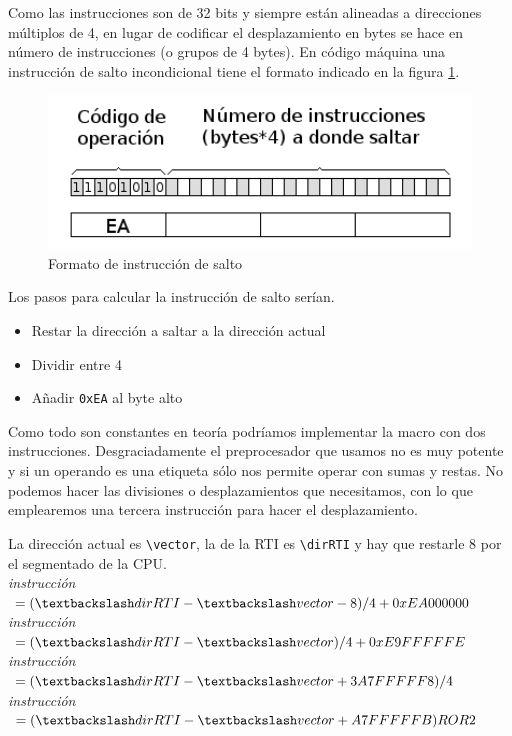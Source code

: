Como las instrucciones son de 32 bits y siempre están alineadas a direcciones múltiplos
de 4, en lugar de codificar el desplazamiento en bytes se hace en número de
instrucciones (o grupos de 4 bytes). En código máquina una instrucción de salto
incondicional tiene el formato indicado en la figura \ref{fig:codsalto}.

\begin{figure}[h]
  \centering
    \includegraphics[width=14cm]{graphs/codsalto.png}
  \caption{Formato de instrucción de salto}
  \label{fig:codsalto}
\end{figure}

Los pasos para calcular la instrucción de salto serían.

\begin{itemize}
  \item Restar la dirección a saltar a la dirección actual
  \item Dividir entre 4
  \item Añadir {\tt 0xEA} al byte alto
\end{itemize}

Como todo son constantes en teoría podríamos implementar la
macro con dos instrucciones. Desgraciadamente el preprocesador
que usamos no es muy potente y si un operando es una etiqueta
sólo nos permite operar con sumas y restas. No podemos hacer las
divisiones o desplazamientos que necesitamos, con lo que emplearemos
una tercera instrucción para hacer el desplazamiento.

La dirección actual es {\tt \textbackslash vector}, la de la RTI
es {\tt \textbackslash dirRTI} y hay que restarle 8 por el
segmentado de la CPU.
\\
{\it instrucción }$ = (\textbackslash dirRTI-\textbackslash vector-8)/4 + 0xEA000000$ \\
{\it instrucción }$ = (\textbackslash dirRTI-\textbackslash vector)/4 + 0xE9FFFFFE$ \\
{\it instrucción }$ = (\textbackslash dirRTI-\textbackslash vector+3A7FFFFF8)/4$ \\
{\it instrucción }$ = (\textbackslash dirRTI-\textbackslash vector+A7FFFFFB) ROR 2$

